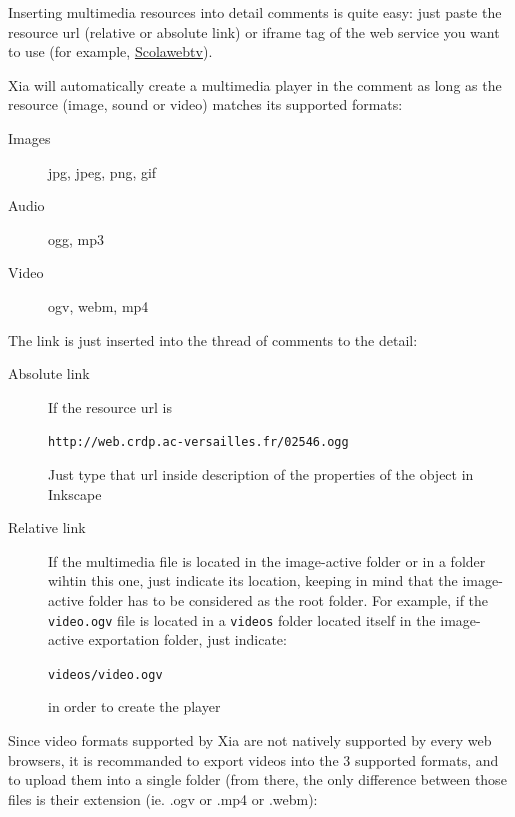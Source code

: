 Inserting multimedia resources into detail comments is quite easy: just paste 
the resource url (relative or absolute link) or iframe tag of the web service 
you want to use (for example, \href{https://scolawebtv.crdp-versailles.fr/}
{Scolawebtv}).

Xia will automatically create a multimedia player in the comment as long as 
the resource (image, sound or video) matches its supported formats: 
\begin{description}
 \item [Images] jpg, jpeg, png, gif
 \item [Audio] ogg, mp3
 \item [Video] ogv, webm, mp4
\end{description}

The link is just inserted into the thread of comments to the detail:
\begin{description}
 \item[Absolute link] If the resource url is
 
 \verb|http://web.crdp.ac-versailles.fr/02546.ogg|
 
 Just type that url inside description of the properties of the object in 
 Inkscape  \item [Relative link] If the multimedia file is located in the image-active 
 folder or in a folder wihtin this one, just indicate its location, keeping in 
 mind that the image-active folder has to be considered as the root folder. 
 For example, if the \verb|video.ogv| file is located in a \verb|videos| 
 folder located itself in the image-active exportation folder, just indicate:
 
  \verb|videos/video.ogv|
 
  in order to create the player
\end{description}

Since video formats supported by Xia are not natively supported by every web 
browsers, it is recommanded to export videos into the 3 supported formats, 
and to upload them into a single folder (from there, the only difference 
between those files is their extension (ie. .ogv or .mp4 or .webm):\\


